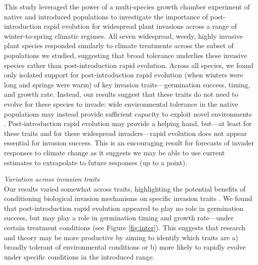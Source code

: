 \documentclass[11pt]{article}\usepackage[]{graphicx}\usepackage[]{color}
\begin{document}
	This study leveraged the power of a multi-species growth chamber experiment of native and introduced populations to investigate the importance of post-introduction rapid evolution for widespread plant invasions across a range of winter-to-spring climatic regimes. All seven widespread, weedy, highly invasive plant species responded similarly to climate treatments across the subset of populations we studied, suggesting that broad tolerance underlies these invasive species rather than post-introduction rapid evolution. Across all species, we found only isolated support for post-introduction rapid evolution (when winters were long and springs were warm) of key invasion traits---germination success, timing, and growth rate. Instead, our results suggest that these traits do not need to evolve for these species to invade: wide environmental tolerance in the native populations may instead provide sufficient capacity to exploit novel environments \parencite{Baker1965}. Post-introduction rapid evolution may provide a helping hand, but---at least for these traits and for these widespread invaders---rapid evolution does not appear essential for invasion success. This is an encouraging result for forecasts of invader responses to climate change as it suggests we may be able to use current estimates to extrapolate to future responses (up to a point). %
	
\emph{Variation across invasion traits}\\ %
	Our results varied somewhat across traits, highlighting the potential benefits of conditioning biological invasion mechanisms on specific invasion traits \parencite{Maillet2000}. We found that post-introduction rapid evolution appeared to play no role in germination success, but may play a role in germination timing and growth rate---under certain treatment conditions (see Figure \ref{fig:inter}). This suggests that research and theory may be more productive by aiming to identify which traits are a) broadly tolerant of environmental conditions or b) more likely to rapidly evolve under specific conditions in the introduced range. 
\end{document}
